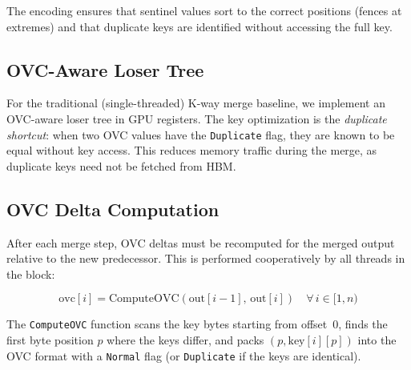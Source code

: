 \documentclass[conference,10pt]{IEEEtran}
\begin{document}
The encoding ensures that sentinel values sort to the correct positions
(fences at extremes) and that duplicate keys are identified without
accessing the full key.

\subsection{OVC-Aware Loser Tree}

For the traditional (single-threaded) K-way merge baseline, we implement
an OVC-aware loser tree in GPU registers.  The key optimization is
the \emph{duplicate shortcut}: when two OVC values have the
\texttt{Duplicate} flag, they are known to be equal without key access.
This reduces memory traffic during the merge, as duplicate keys need not
be fetched from HBM.

\begin{algorithm}[t]
  \caption{OVC Comparison}
  \label{alg:ovc_compare}
  \BlankLine
\end{algorithm}

\subsection{OVC Delta Computation}

After each merge step, OVC deltas must be recomputed for the merged
output relative to the new predecessor.  This is performed cooperatively
by all threads in the block:

\begin{equation}
  \text{ovc}[i] = \text{ComputeOVC}(\text{out}[i{-}1],\, \text{out}[i])
  \quad \forall\, i \in [1, n)
  \label{eq:ovc_delta}
\end{equation}

The \texttt{ComputeOVC} function scans the key bytes starting from
offset~0, finds the first byte position $p$ where the keys differ, and
packs $(p, \text{key}[i][p])$ into the OVC format with a \texttt{Normal}
flag (or \texttt{Duplicate} if the keys are identical).


\end{document}
